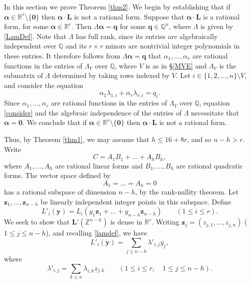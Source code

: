 \documentclass[12pt,reqno]{amsart}
\theoremstyle{definition}
\theoremstyle{remark}
\numberwithin{equation}{section}
\begin{document}
In this section we prove Theorem \ref{thm2}. We begin by establishing that  if ${\boldsymbol{{\alpha}}} \in {\mathbb R}^r \setminus \{ {\mathbf 0} \}$ then ${\boldsymbol{{\alpha}}} \cdot {\mathbf L}$ is not a rational form. Suppose that ${\boldsymbol{{\alpha}}} \cdot {\mathbf L}$ is a rational form, for some ${\boldsymbol{{\alpha}}} \in {\mathbb R}^r$. Then ${{\Lambda}} {\boldsymbol{{\alpha}}} = {\mathbf q}$ for some ${\mathbf q} \in {\mathbb Q}^n$, where ${{\Lambda}}$ is given by \eqref{LamDef}. Note that ${{\Lambda}}$ has full rank, since its entries are algebraically independent over ${\mathbb Q}$ and its $r \times r$ minors are nontrivial integer polynomials in these entries. It therefore follows from ${{\Lambda}} {\boldsymbol{{\alpha}}} = {\mathbf q}$ that ${{\alpha}}_1, \ldots, {{\alpha}}_r$ are rational functions in the entries of ${{\Lambda}}_V$ over ${\mathbb Q}$, where $V$ is as in \S \ref{MVE} and ${{\Lambda}}_V$ is the submatrix of ${{\Lambda}}$ determined by taking rows indexed by $V$. Let $i \in \{ 1,2,\ldots,n \} \setminus V$, and consider the equation
\begin{equation} \label{consider}
{{\alpha}}_1 {{\lambda}}_{1,i} + {{\alpha}}_r {{\lambda}}_{r,i} = q_i.
\end{equation}
Since ${{\alpha}}_1, \ldots, {{\alpha}}_r$ are rational functions in the entries of ${{\Lambda}}_V$ over ${\mathbb Q}$, equation \eqref{consider} and the algebraic independence of the entries of ${{\Lambda}}$ necessitate that ${\boldsymbol{{\alpha}}} = {\mathbf 0}$. We conclude that  if ${\boldsymbol{{\alpha}}} \in {\mathbb R}^r \setminus \{ {\mathbf 0} \}$ then ${\boldsymbol{{\alpha}}} \cdot {\mathbf L}$ is not a rational form.

Thus, by Theorem \ref{thm1}, we may assume that $h {\leqslant} 16 + 8r$, and so $n-h > r$. Write
\[
C = A_1 B_1 + \ldots + A_h B_h,
\]
where $A_1, \ldots, A_h$ are rational linear forms and $B_1, \ldots, B_h$ are rational quadratic forms. The vector space defined by
\[
A_1 = \ldots = A_h = 0
\]
has a rational subspace of dimension $n-h$, by the rank-nullity theorem. Let ${\mathbf z}_1, \ldots, {\mathbf z}_{n-h}$ be linearly independent integer points in this subspace. Define
\[
L'_i({\mathbf y}) = L_i (y_1 {\mathbf z}_1 + \ldots + y_{n-h} {\mathbf z}_{n-h}) \qquad (1 {\leqslant} i {\leqslant} r).
\]
We seek to show that ${\mathbf L}'({\mathbb Z}^{n-h})$ is dense in ${\mathbb R}^r$. Writing ${\mathbf z}_j = (z_{j,1}, \ldots, z_{j,n})$ ($1 {\leqslant} j {\leqslant} n-h$), and recalling \eqref{lamdef}, we have
\[
L'_i({\mathbf y}) = \sum_{j {\leqslant} n-h} {{\lambda}}'_{i,j} y_j,
\]
where
\[
{{\lambda}}'_{i,j} = \sum_{k {\leqslant} n} {{\lambda}}_{i,k} z_{j,k} \qquad (1 {\leqslant} i {\leqslant} r, \quad 1 {\leqslant} j {\leqslant} n-h).
\]
\end{document}
